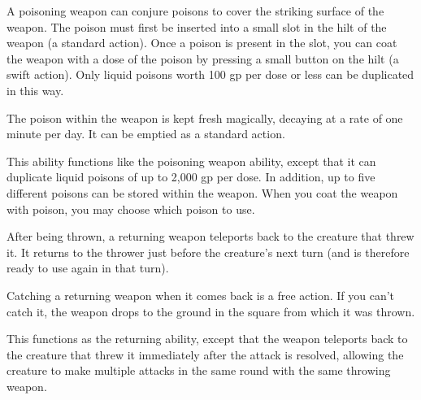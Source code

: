 
 A poisoning weapon can conjure poisons to cover the striking surface of the weapon. The poison must first be inserted into a small slot in the hilt of the weapon (a standard action). Once a poison is present in the slot, you can coat the weapon with a dose of the poison by pressing a small button on the hilt (a swift action). Only liquid poisons worth 100 gp per dose or less can be duplicated in this way. 

The poison within the weapon is kept fresh magically, decaying at a rate of one minute per day. It can be emptied as a standard action. 


 This ability functions like the poisoning weapon ability, except that it can duplicate liquid poisons of up to 2,000 gp per dose. In addition, up to five different poisons can be stored within the weapon. When you coat the weapon with poison, you may choose which poison to use. 


 After being thrown, a returning weapon teleports back to the creature that threw it. It returns to the thrower just before the creature's next turn (and is therefore ready to use again in that turn).

Catching a returning weapon when it comes back is a free action. If you can't catch it, the weapon drops to the ground in the square from which it was thrown.


 This functions as the returning ability, except that the weapon teleports back to the creature that threw it immediately after the attack is resolved, allowing the creature to make multiple attacks in the same round with the same throwing weapon. 


